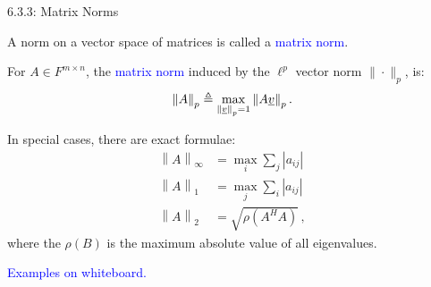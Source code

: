 \documentclass[10pt,letterpaper,english]{beamer}
\begin{document}
\begin{frame}{6.3.3: Matrix Norms}

A norm on a vector space of matrices is called a \textcolor{blue}{matrix norm}.

\begin{definition}
For $A\in F^{m\times n}$, the \textcolor{blue}{matrix norm} induced by the $\ell^p$ vector norm $\|\cdot\|_p$,  is:
\[ \left\| A \right\|_p \triangleq \max_{\left\| \underline{v} \right\|_p = 1} \left\| A \underline{v} \right\|_p. \]
\end{definition}

In special cases, there are exact formulae:
\begin{align*}
\left\| A \right\|_{\infty} &=
\max_{i} \sum_{j} |a_{ij}| \\
\left\| A \right\|_{1} &= 
\max_{j} \sum_{i} |a_{ij}| \\
\left\| A \right\|_{2} &= 
\sqrt{\rho (A^H A)} \, ,
\end{align*}
where the $\rho(B)$ is the maximum absolute value of all eigenvalues.

\vspace{3mm}

\textcolor{blue}{Examples on whiteboard.}

\end{frame}
\end{document}
